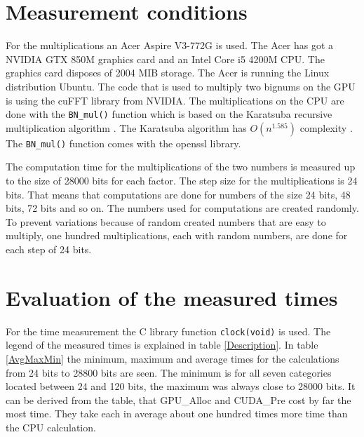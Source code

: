 \documentclass[12pt,a4paper]{article}
\begin{document}
\section{Measurement conditions}
For the multiplications an Acer Aspire V3-772G is used. The Acer has got a NVIDIA GTX 850M graphics card and an Intel Core i5 4200M CPU. The graphics card disposes of 2004 MIB storage. The Acer is running the Linux distribution Ubuntu. The code that is used to multiply two bignums on the GPU is using the cuFFT library from NVIDIA. The multiplications on the CPU are done with the \texttt{BN_mul()} function which is based on the Karatsuba recursive multiplication algorithm \cite{young1995bnmul}. The Karatsuba algorithm has $O(n^{1.585})$ complexity \cite{dietzfelbinger2012eff}. The \texttt{BN_mul()} function comes with the openssl library.

The computation time for the multiplications of the two numbers is measured up to the size of 28000 bits for each factor. The step size for the multiplications is 24 bits. That means that computations are done for numbers of the size 24 bits, 48 bits, 72 bits and so on. The numbers used for computations are created randomly. To prevent variations because of random created numbers that are easy to multiply, one hundred multiplications, each with random numbers, are done for each step of 24 bits.

\section{Evaluation of the measured times}
For the time measurement the C library function \texttt{clock(void)} is used. The legend of the measured times is explained in table \ref{Description}. In table \ref{AvgMaxMin} the minimum, maximum and average times for the calculations from 24 bits to 28800 bits are seen. The minimum is for all seven categories located between 24 and 120 bits, the maximum was always close to 28000 bits. It can be derived from the table, that GPU\_Alloc and CUDA\_Pre cost by far the most time. They take each in average about one hundred times more time than the CPU calculation.
\end{document}
